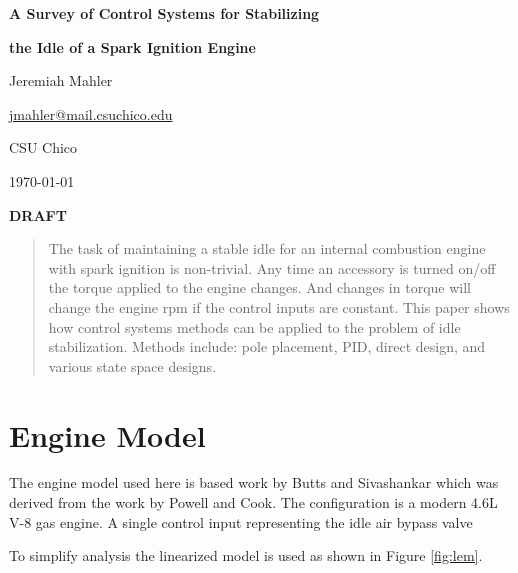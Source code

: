 \documentclass{article}
\begin{document}

\thispagestyle{empty}

\centerline{\Large \textbf{A Survey of Control Systems for Stabilizing}}
\centerline{\Large \textbf{the Idle of a Spark Ignition Engine}}
\vspace{0.1in}
\centerline{\normalsize {Jeremiah Mahler}}
\centerline{\small {\href{mailto:jmahler@mail.csuchico.edu}{jmahler@mail.csuchico.edu}} }
\vspace{0.1in}
\centerline{\normalsize {CSU Chico}}
\centerline{\small \today}
\vspace{0.2in}
\centerline{\LARGE \textbf{DRAFT}}
\vspace{0.2in}


\begin{abstract}
\noindent
The task of maintaining a stable idle for an internal combustion
engine with spark ignition is non-trivial.
Any time an accessory is turned on/off the torque applied to
the engine changes.
And changes in torque will change the engine rpm if the control
inputs are constant.
This paper shows how control systems methods can be applied to
the problem of idle stabilization.
Methods include: pole placement, PID, direct design, and
various state space designs.

\end{abstract}

\section{Engine Model}

The engine model used here is based work
by Butts and Sivashankar\autocite{532315} which was derived from
the work by Powell and Cook\autocite{4789342}.
The configuration is a modern 4.6L V-8 gas engine.
A single control input representing the idle air bypass valve 

To simplify analysis the linearized model is used as shown in
Figure \ref{fig:lem}.
\end{document}
